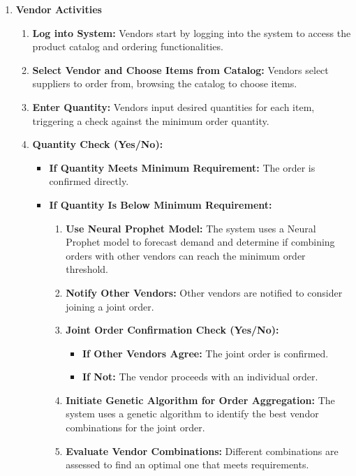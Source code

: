 \begin{enumerate}
    \item \textbf{Vendor Activities}
          \begin{enumerate}
              \item \textbf{Log into System:} Vendors start by logging into the system to access the product catalog and ordering functionalities.
              \item \textbf{Select Vendor and Choose Items from Catalog:} Vendors select suppliers to order from, browsing the catalog to choose items.
              \item \textbf{Enter Quantity:} Vendors input desired quantities for each item, triggering a check against the minimum order quantity.
              \item \textbf{Quantity Check (Yes/No):}
                    \begin{itemize}
                        \item \textbf{If Quantity Meets Minimum Requirement:} The order is confirmed directly.
                        \item \textbf{If Quantity Is Below Minimum Requirement:}
                              \begin{enumerate}
                                  \item \textbf{Use Neural Prophet Model:} The system uses a Neural Prophet model to forecast demand and determine if combining orders with other vendors can reach the minimum order threshold.
                                  \item \textbf{Notify Other Vendors:} Other vendors are notified to consider joining a joint order.
                                  \item \textbf{Joint Order Confirmation Check (Yes/No):}
                                        \begin{itemize}
                                            \item \textbf{If Other Vendors Agree:} The joint order is confirmed.
                                            \item \textbf{If Not:} The vendor proceeds with an individual order.
                                        \end{itemize}
                                  \item \textbf{Initiate Genetic Algorithm for Order Aggregation:} The system uses a genetic algorithm to identify the best vendor combinations for the joint order.
                                  \item \textbf{Evaluate Vendor Combinations:} Different combinations are assessed to find an optimal one that meets requirements.

\end{enumerate}
\end{itemize}
\end{enumerate}
\end{enumerate}
